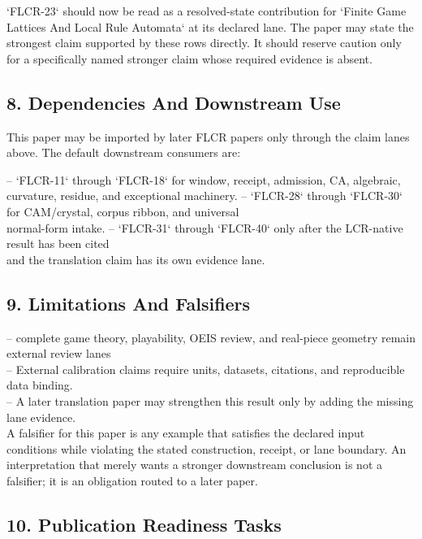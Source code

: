 \documentclass[11pt]{article}
\begin{document}
`FLCR-23` should now be read as a resolved-state contribution for `Finite Game Lattices And Local Rule Automata` at its declared lane. The paper may state the strongest claim supported by these rows directly. It should reserve caution only for a specifically named stronger claim whose required evidence is absent.

\subsection*{8. Dependencies And Downstream Use}

This paper may be imported by later FLCR papers only through the claim lanes
above. The default downstream consumers are:

\noindent{}-- `FLCR-11` through `FLCR-18` for window, receipt, admission, CA, algebraic,\\
  curvature, residue, and exceptional machinery.
\noindent{}-- `FLCR-28` through `FLCR-30` for CAM/crystal, corpus ribbon, and universal\\
  normal-form intake.
\noindent{}-- `FLCR-31` through `FLCR-40` only after the LCR-native result has been cited\\
  and the translation claim has its own evidence lane.

\subsection*{9. Limitations And Falsifiers}

\noindent{}-- complete game theory, playability, OEIS review, and real-piece geometry remain external review lanes\\
\noindent{}-- External calibration claims require units, datasets, citations, and reproducible data binding.\\
\noindent{}-- A later translation paper may strengthen this result only by adding the missing lane evidence.\\

A falsifier for this paper is any example that satisfies the declared input
conditions while violating the stated construction, receipt, or lane boundary.
An interpretation that merely wants a stronger downstream conclusion is not a
falsifier; it is an obligation routed to a later paper.

\subsection*{10. Publication Readiness Tasks}
\end{document}

